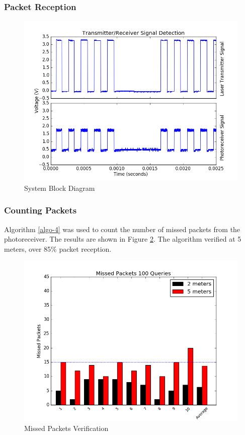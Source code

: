 \documentclass[letterpaper,10pt]{article}
\begin{document}
\begin{spacing}{1.15}
\subsubsection{Packet Reception}
\begin{figure} [H]
	\centering
	\includegraphics[scale=0.45]{packet_verification.png}
	\caption{System Block Diagram\label{fig:packet-verification}}
\end{figure}

\subsubsection {Counting Packets}
Algorithm \ref{algo-4} was used to count the number of missed packets from the photoreceiver.
The results are shown in Figure \ref{fig:transmitted-received}. The algorithm verified at 5 meters, over 85\% packet reception.

\begin{figure} [H]
	\centering
	\includegraphics[scale=0.45]{transmitted_received.png}
	\caption{Missed Packets Verification\label{fig:transmitted-received}}
\end{figure}



\end{spacing}
\end{document}

